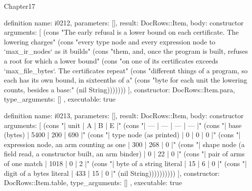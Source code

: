 \begin{lexlean}{Chapter17}
\begin{semanticmodule}
definition{
  name: i0212,
  parameters: [],
  result: DocRows::Item,
  body: constructor{
    arguments: [
      (cons "The early refusal is a lower bound on each certificate. The lowering charges" (cons "every type node and every expression node to `max_ir_nodes` as it builds" (cons "them, and, once the program is built, refuses a root for which a lower bound" (cons "on one of its certificates exceeds `max_file_bytes`. The certificates repeat" (cons "different things of a program, so each has its own bound, in sixteenths of a" (cons "byte for each unit the lowering counts, besides a base:" (nil String)))))))
    ],
    constructor: DocRows::Item.para,
    type_arguments: []
  },
  executable: true
}

definition{
  name: i0213,
  parameters: [],
  result: DocRows::Item,
  body: constructor{
    arguments: [
      (cons "| unit | A | B | E |" (cons "| --- | --- | --- | --- |" (cons "| base (bytes) | 5400 | 200 | 690 |" (cons "| type node (as printed) | 0 | 0 | 0 |" (cons "| expression node, an arm counting as one | 300 | 268 | 0 |" (cons "| shape node (a field read, a constructor built, an arm binder) | 0 | 22 | 0 |" (cons "| pair of arms of one match | 1018 | 0 | 2 |" (cons "| byte of a string literal | 15 | 6 | 0 |" (cons "| digit of a bytes literal | 433 | 15 | 0 |" (nil String))))))))))
    ],
    constructor: DocRows::Item.table,
    type_arguments: []
  },
  executable: true
}


\end{semanticmodule}
\end{lexlean}
